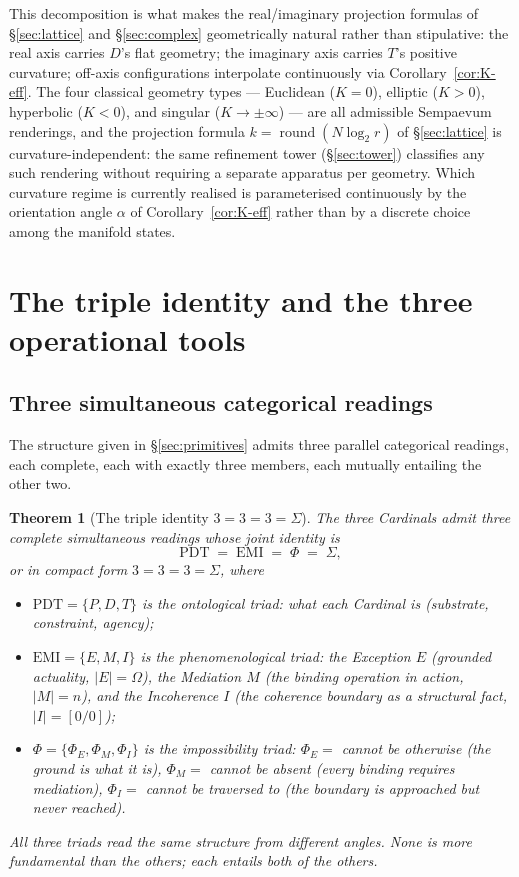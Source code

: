 \documentclass[11pt,a4paper]{article}
\newtheorem{theorem}{Theorem}[section]
\theoremstyle{definition}
\theoremstyle{remark}
\DeclareMathOperator{\round}{round}
\begin{document}
This decomposition is what makes the real/imaginary projection formulas of \S\ref{sec:lattice} and \S\ref{sec:complex} geometrically natural rather than stipulative: the real axis carries $D$'s flat geometry; the imaginary axis carries $T$'s positive curvature; off-axis configurations interpolate continuously via Corollary~\ref{cor:K-eff}. The four classical geometry types --- Euclidean ($K=0$), elliptic ($K>0$), hyperbolic ($K<0$), and singular ($K\to\pm\infty$) --- are all admissible Sempaevum renderings, and the projection formula $k = \round(N\log_{2} r)$ of \S\ref{sec:lattice} is curvature-independent: the same refinement tower (\S\ref{sec:tower}) classifies any such rendering without requiring a separate apparatus per geometry. Which curvature regime is currently realised is parameterised continuously by the orientation angle $\alpha$ of Corollary~\ref{cor:K-eff} rather than by a discrete choice among the manifold states.

\section{The triple identity and the three operational tools}\label{sec:triads}

\subsection{Three simultaneous categorical readings}

The structure given in \S\ref{sec:primitives} admits three parallel categorical readings, each complete, each with exactly three members, each mutually entailing the other two.

\begin{theorem}[The triple identity $3=3=3=\Sigma$]\label{thm:triads}
The three Cardinals admit three complete simultaneous readings whose joint identity is
\[
\boxed{\;\mathrm{PDT} \;=\; \mathrm{EMI} \;=\; \Phi \;=\; \Sigma,\;}
\]
or in compact form $3=3=3=\Sigma$, where
\begin{itemize}[leftmargin=*]
\item $\mathrm{PDT} = \{P,D,T\}$ is the \emph{ontological} triad: what each Cardinal is (substrate, constraint, agency);
\item $\mathrm{EMI} = \{E,M,I\}$ is the \emph{phenomenological} triad: the Exception $E$ (grounded actuality, $|E|=\Omega$), the Mediation $M$ (the binding operation in action, $|M|=n$), and the Incoherence $I$ (the coherence boundary as a structural fact, $|I|=[0/0]$);
\item $\Phi = \{\Phi_{E},\Phi_{M},\Phi_{I}\}$ is the \emph{impossibility} triad: $\Phi_{E} = $ \textit{cannot be otherwise} (the ground is what it is), $\Phi_{M} = $ \textit{cannot be absent} (every binding requires mediation), $\Phi_{I} = $ \textit{cannot be traversed to} (the boundary is approached but never reached).
\end{itemize}
All three triads read the same structure from different angles. None is more fundamental than the others; each entails both of the others.
\end{theorem}
\end{document}

